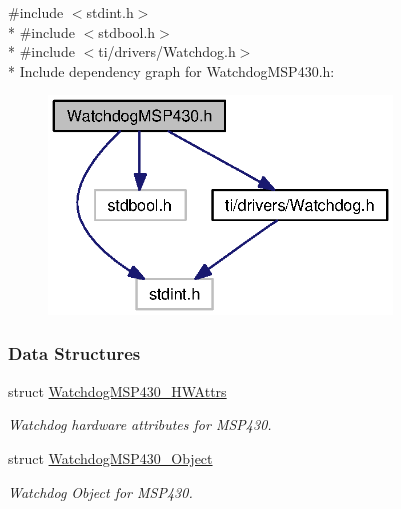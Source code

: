 {\ttfamily \#include $<$stdint.\+h$>$}\\*
{\ttfamily \#include $<$stdbool.\+h$>$}\\*
{\ttfamily \#include $<$ti/drivers/\+Watchdog.\+h$>$}\\*
Include dependency graph for Watchdog\+M\+S\+P430.\+h\+:
\nopagebreak
\begin{figure}[H]
\begin{center}
\leavevmode
\includegraphics[width=259pt]{_watchdog_m_s_p430_8h__incl}
\end{center}
\end{figure}
\subsubsection*{Data Structures}
\begin{DoxyCompactItemize}
\item 
struct \hyperlink{struct_watchdog_m_s_p430___h_w_attrs}{Watchdog\+M\+S\+P430\+\_\+\+H\+W\+Attrs}
\begin{DoxyCompactList}\small\item\em Watchdog hardware attributes for M\+S\+P430. \end{DoxyCompactList}\item 
struct \hyperlink{struct_watchdog_m_s_p430___object}{Watchdog\+M\+S\+P430\+\_\+\+Object}
\begin{DoxyCompactList}\small\item\em Watchdog Object for M\+S\+P430. \end{DoxyCompactList}\end{DoxyCompactItemize}
